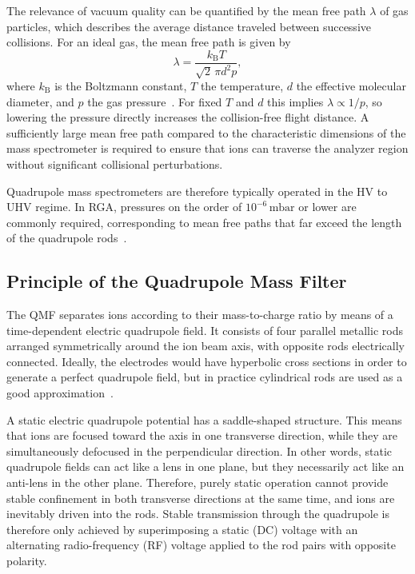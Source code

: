 \documentclass[a4paper]{article}
\begin{document}
The relevance of vacuum quality can be quantified by the mean free path $\lambda$ of gas particles, which describes the average distance traveled between successive collisions.
For an ideal gas, the mean free path is given by
\[
  \lambda = \frac{k_{\mathrm{B}} T}{\sqrt{2}\,\pi d^{2} p},
\]
where $k_{\mathrm{B}}$ is the Boltzmann constant, $T$ the temperature, $d$ the effective molecular diameter, and $p$ the gas pressure~\cite{wiki_mean_free_path}.
For fixed $T$ and $d$ this implies $\lambda \propto 1/p$, so lowering the pressure directly increases the collision-free flight distance.
A sufficiently large mean free path compared to the characteristic dimensions of the mass spectrometer is required to ensure that ions can traverse the analyzer region without significant collisional perturbations.

Quadrupole mass spectrometers are therefore typically operated in the HV to UHV regime.
In RGA, pressures on the order of $10^{-6}\,\mathrm{mbar}$ or lower are commonly required, corresponding to mean free paths that far exceed the length of the quadrupole rods~\cite{jousten_ellefson_partialdruckmessung_2017}.

\subsection{Principle of the Quadrupole Mass Filter}

The QMF separates ions according to their mass-to-charge ratio by means of a time-dependent electric quadrupole field.
It consists of four parallel metallic rods arranged symmetrically around the ion beam axis, with opposite rods electrically connected.
Ideally, the electrodes would have hyperbolic cross sections in order to generate a perfect quadrupole field, but in practice cylindrical rods are used as a good approximation~\cite{demtroeder_atome_molekuele_2005}.

A static electric quadrupole potential has a saddle-shaped structure.
This means that ions are focused toward the axis in one transverse direction, while they are simultaneously defocused in the perpendicular direction.
In other words, static quadrupole fields can act like a lens in one plane, but they necessarily act like an anti-lens in the other plane.
Therefore, purely static operation cannot provide stable confinement in both transverse directions at the same time, and ions are inevitably driven into the rods.
Stable transmission through the quadrupole is therefore only achieved by superimposing a static (DC) voltage with an alternating radio-frequency (RF) voltage applied to the rod pairs with opposite polarity.
\end{document}
